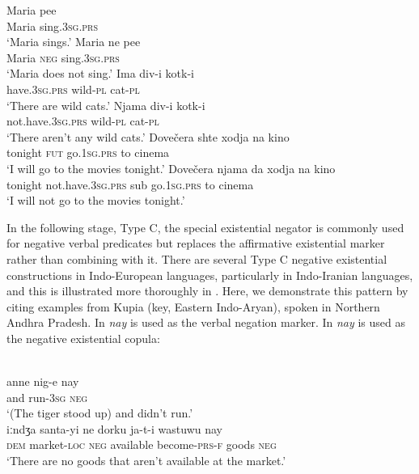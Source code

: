 ﻿\documentclass[output=paper]{langsci/langscibook}
\begin{document}
\begin{exe}\ex\label{ex:ieur-bulgarian-negators}
\begin{xlist}
\ex
    \gll Maria pee \\
Maria sing.\textsc{3sg}.\textsc{prs} \\
    \glt `Maria sings.'
\ex
\gll Maria ne pee \\
Maria \textsc{neg} sing.\textsc{3sg}.\textsc{prs} \\
\glt `Maria does not sing.'
\ex\gll Ima div-i kotk-i \\ 
   have.\textsc{3sg}.\textsc{prs} wild-\textsc{pl} cat-\textsc{pl} \\
\glt `There are wild cats.'
\ex\gll Njama div-i kotk-i \\
not.have.\textsc{3sg}.\textsc{prs} wild-\textsc{pl} cat-\textsc{pl} \\
\glt `There aren't any wild cats.'
\ex\gll Dovečera shte xodja na kino \\
tonight     \textsc{fut} go.\textsc{1sg}.\textsc{prs}  to cinema \\
\glt `I will go to the movies tonight.'
\ex\gll Dovečera njama                  da   xodja          na  kino\\
tonight not.have.\textsc{3sg}.\textsc{prs} sub go.\textsc{1sg.prs} to
cinema \\
\glt `I will not go to the movies tonight.'
    \end{xlist}\end{exe}
%
In the following stage, Type C, the special existential negator is commonly
used for negative verbal predicates but replaces the affirmative
existential marker rather than combining with it. There are several Type C
negative existential constructions in Indo-European languages, particularly
in Indo-Iranian languages, and this is illustrated more thoroughly in
. Here, we demonstrate this pattern by citing
examples from Kupia (key, Eastern Indo-Aryan), spoken in Northern Andhra
Pradesh. In  \textit{nay} is used as the verbal
negation marker. In  \textit{nay} is used as the negative existential copula:
%
\begin{exe}\ex\begin{xlist}
\ex\label{ex:ieur-kupia-tiger}
\\
    \gll anne nig-e          nay \\
            and   run-\textsc{3sg}      \textsc{neg} \\
    \glt `(The tiger stood up) and didn't run.'
\ex\label{ex:ieur-kupia-market}
\\
\gll iːndʒa santa-yi ne dorku ja-t-i wastuwu nay\\
    \textsc{dem}     market-\textsc{loc} \textsc{neg} available
    become-\textsc{prs-f}
goods      \textsc{neg}\\
\glt `There are no goods that aren't available at the market.'
\end{xlist}\end{exe}
\end{document}
